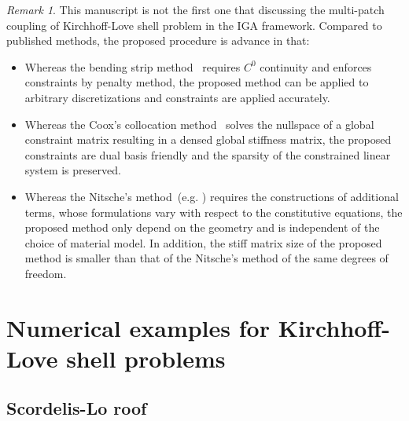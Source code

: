 \documentclass[preprint,12pt]{elsarticle}
\theoremstyle{remark}
\newtheorem{remark}{Remark}
\begin{document}
\begin{remark}
    This manuscript is not the first one that discussing the multi-patch coupling of Kirchhoff-Love shell problem in the IGA framework. Compared to published methods, the proposed procedure is advance in that:
    \begin{itemize}
        \item Whereas the bending strip method~\cite{kiendl2010bending} requires $C^0$ continuity and enforces constraints by penalty method, the proposed method can be applied to arbitrary discretizations and constraints are applied accurately.
        \item Whereas the Coox's collocation method~\cite{coox2017flexible} solves the nullspace of a global constraint matrix resulting in a densed global stiffness matrix, the proposed constraints are dual basis friendly and the sparsity of the constrained linear system is preserved.
        \item Whereas the Nitsche's method~(e.g. \cite{guo_nitsches_2015}) requires the constructions of additional terms, whose formulations vary with respect to the constitutive equations, the proposed method only depend on the geometry and is independent of the choice of material model. In addition, the stiff matrix size of the proposed method is smaller than that of the Nitsche's method of the same degrees of freedom.
    \end{itemize} 
\end{remark}

\section{Numerical examples for Kirchhoff-Love shell problems}

\subsection{Scordelis-Lo roof}
\end{document}
